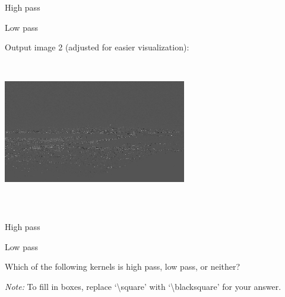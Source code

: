 \documentclass{csci1430}
\begin{document}
\begin{answerlist}
    \item High pass
    \item Low pass
\end{answerlist}

\begin{subsubquestion}[points=2]
Output image 2 (adjusted for easier visualization):\\
\includegraphics[width=0.6\textwidth,height=7cm,keepaspectratio]{images/q3img2.png}
\end{subsubquestion}

\begin{answerlist}
    \item High pass
    \item Low pass
\end{answerlist}

\pagebreak

\begin{subquestion}[points=3]
Which of the following kernels is high pass, low pass, or neither?
\end{subquestion}

\emph{Note:} To fill in boxes, replace `\textbackslash square' with `\textbackslash blacksquare' for your answer.
\end{document}
